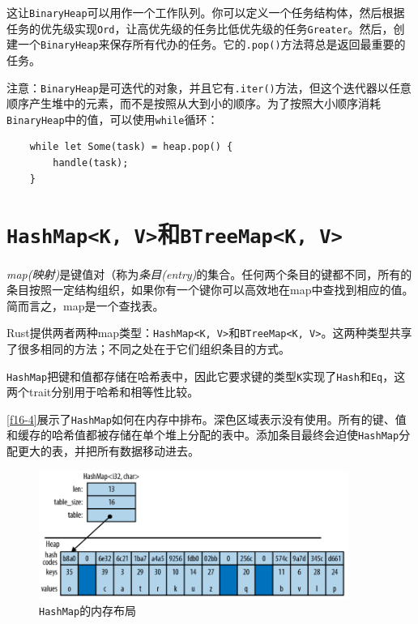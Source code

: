 这让\texttt{BinaryHeap}可以用作一个工作队列。你可以定义一个任务结构体，然后根据任务的优先级实现\texttt{Ord}，让高优先级的任务比低优先级的任务\texttt{Greater}。然后，创建一个\texttt{BinaryHeap}来保存所有代办的任务。它的\texttt{.pop()}方法蒋总是返回最重要的任务。

注意：\texttt{BinaryHeap}是可迭代的对象，并且它有\texttt{.iter()}方法，但这个迭代器以任意顺序产生堆中的元素，而不是按照从大到小的顺序。为了按照大小顺序消耗\texttt{BinaryHeap}中的值，可以使用\texttt{while}循环：
\begin{verbatim}
    while let Some(task) = heap.pop() {
        handle(task);
    }
\end{verbatim}

\section{\texttt{HashMap<K, V>}和\texttt{BTreeMap<K, V>}}

\emph{map(映射)}是键值对（称为\emph{条目(entry)}的集合。任何两个条目的键都不同，所有的条目按照一定结构组织，如果你有一个键你可以高效地在map中查找到相应的值。简而言之，map是一个查找表。

Rust提供两者两种map类型：\texttt{HashMap<K, V>}和\texttt{BTreeMap<K, V>}。这两种类型共享了很多相同的方法；不同之处在于它们组织条目的方式。

\texttt{HashMap}把键和值都存储在哈希表中，因此它要求键的类型\texttt{K}实现了\texttt{Hash}和\texttt{Eq}，这两个trait分别用于哈希和相等性比较。

\autoref{f16-4}展示了\texttt{HashMap}如何在内存中排布。深色区域表示没有使用。所有的键、值和缓存的哈希值都被存储在单个堆上分配的表中。添加条目最终会迫使\texttt{HashMap}分配更大的表，并把所有数据移动进去。

\begin{figure}[htbp]
    \centering
    \includegraphics[width=0.9\textwidth]{../img/f16-4.png}
    \caption{\texttt{HashMap}的内存布局}
    \label{f16-4}
\end{figure}

